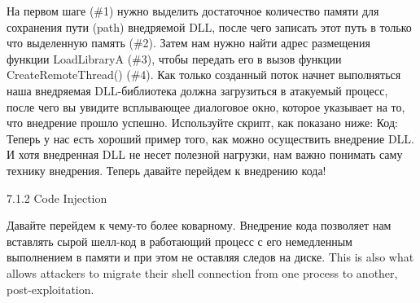 \documentclass[12pt]{book}
\begin{document}






На первом шаге (\#1) нужно выделить достаточное количество памяти для сохранения пути (path) внедряемой DLL, после чего записать этот путь в только что выделенную память (\#2). Затем нам нужно найти адрес размещения функции LoadLibraryA (\#3), чтобы передать его в вызов функции CreateRemoteThread() (\#4). Как только созданный поток начнет выполняться наша внедряемая DLL-библиотека должна загрузиться в атакуемый процесс, после чего вы увидите всплывающее диалоговое окно, которое указывает на то, что внедрение прошло успешно. Используйте скрипт, как показано ниже:
Код:
Теперь у нас есть хороший пример того, как можно осуществить внедрение DLL. И хотя внедренная DLL не несет полезной нагрузки, нам важно понимать саму технику внедрения. Теперь давайте перейдем к внедрению кода!

7.1.2 Code Injection

Давайте перейдем к чему-то более коварному. Внедрение кода позволяет нам вставлять сырой шелл-код в работающий процесс с его немедленным выполнением в памяти и при этом не оставляя следов на диске. This is also what allows attackers to migrate their shell connection from one process to another, post-exploitation.
\end{document}

